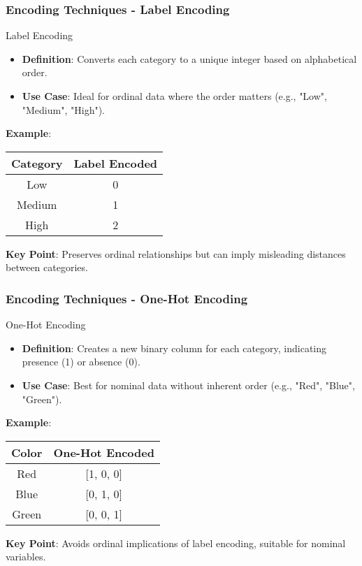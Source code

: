\documentclass[aspectratio=169]{beamer}
\begin{document}
\begin{frame}[fragile]
  \frametitle{Encoding Techniques - Label Encoding}
  \begin{block}{Label Encoding}
    \begin{itemize}
        \item \textbf{Definition}: Converts each category to a unique integer based on alphabetical order.
        \item \textbf{Use Case}: Ideal for ordinal data where the order matters (e.g., "Low", "Medium", "High").
    \end{itemize}
    \textbf{Example}:
    \renewcommand{\arraystretch}{1.5} %
    \begin{center}
      \begin{tabular}{|c|c|}
        \hline
        \textbf{Category} & \textbf{Label Encoded} \\
        \hline
        Low & 0 \\
        Medium & 1 \\
        High & 2 \\
        \hline
      \end{tabular}
    \end{center}
    \textbf{Key Point}: Preserves ordinal relationships but can imply misleading distances between categories.
  \end{block}
\end{frame}

\begin{frame}[fragile]
  \frametitle{Encoding Techniques - One-Hot Encoding}
  \begin{block}{One-Hot Encoding}
      \begin{itemize}
          \item \textbf{Definition}: Creates a new binary column for each category, indicating presence (1) or absence (0).
          \item \textbf{Use Case}: Best for nominal data without inherent order (e.g., "Red", "Blue", "Green").
      \end{itemize}
      \textbf{Example}:
      \renewcommand{\arraystretch}{1.5} %
      \begin{center}
        \begin{tabular}{|c|c|}
          \hline
          \textbf{Color} & \textbf{One-Hot Encoded} \\
          \hline
          Red & [1, 0, 0] \\
          Blue & [0, 1, 0] \\
          Green & [0, 0, 1] \\
          \hline
        \end{tabular}
      \end{center}
      \textbf{Key Point}: Avoids ordinal implications of label encoding, suitable for nominal variables.
  \end{block}
\end{frame}
\end{document}
